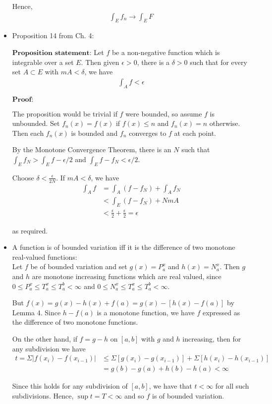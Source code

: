 \documentclass[12pt]{article}
\begin{document}
\begin{itemize}
Hence,
\begin{align*}
\int_E f_n \to \int_E F
\end{align*}

\item Proposition 14 from Ch. 4:

$\textbf{Proposition statement:}$ Let $f$ be a non-negative function which is integrable over a set $E$. Then given $\epsilon > 0$, there is a $\delta > 0$ such that for every set $A \subset E$ with $mA < \delta$, we have
\begin{align*}
\int_A f < \epsilon
\end{align*}

$\textbf{Proof:}$

The proposition would be trivial if $f$ were bounded, so assume $f$ is unbounded. Set $f_n(x) = f(x)$ if $f(x) \leq n$ and $f_n(x) = n$ otherwise. Then each $f_n(x)$ is bounded and $f_n$ converges to $f$ at each point.

By the Monotone Convergence Theorem, there is an $N$ such that $\int_E f_N > \int_E f - \epsilon/2$ and $\int_E f - f_N < \epsilon/2$.

Choose $\delta < \frac{\epsilon}{2N}$. If $mA < \delta$, we have
\begin{align*}
\int_A f &= \int_A (f - f_N) + \int_A f_N\\
&< \int_E (f - f_N) + NmA\\
&< \frac{\epsilon}{2} + \frac{\epsilon}{2} = \epsilon
\end{align*}

as required.
\\
\item A function is of bounded variation iff it is the difference of two monotone real-valued functions:\\

Let $f$ be of bounded variation and set $g(x) = P^x_a$ and $h(x) = N_a^x$. Then $g$ and $h$ are monotone increasing functions which are real valued, since $0 \leq P_a^x \leq T_a^x \leq T_a^b < \infty$ and $0 \leq N_a^x \leq T_a^x \leq T_a^b < \infty$.

But $f(x) = g(x) - h(x) + f(a) = g(x) - [h(x) - f(a)]$ by Lemma 4. Since $h - f(a)$ is a monotone function, we have $f$ expressed as the difference of two monotone functions.

On the other hand, if $f = g - h$ on $[a, b]$ with $g$ and $h$ increasing, then for any subdivision we have
\begin{align*}
t = \Sigma |f(x_i) - f(x_{i-1})| &\leq \Sigma [g(x_i) - g(x_{i-1})] + \Sigma [h(x_i) - h(x_{i-1})]\\
&= g(b) - g(a) + h(b) - h(a) < \infty
\end{align*}

Since this holds for any subdivision of $[a, b]$, we have that $t < \infty$ for all such subdivisions. Hence, $\sup t = T < \infty$ and so $f$ is of bounded variation.
\end{itemize}
\end{document}
